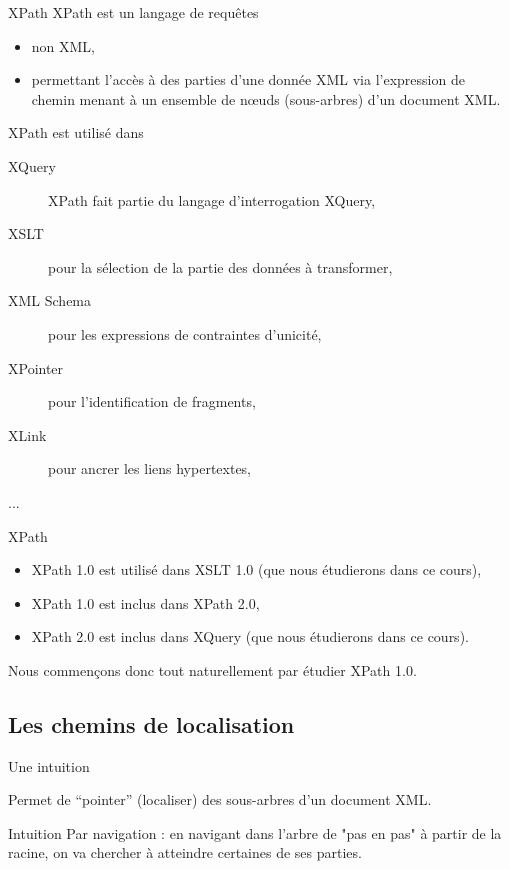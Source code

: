 
\begin{frame}{XPath}
XPath est un langage de requ\^etes
\begin{itemize}
\item non XML,
\item permettant l'accès \`a des parties d’une donn\'ee XML via l'expression de chemin menant \`a un ensemble de n{\oe}uds (sous-arbres) d'un document XML.
\end{itemize}

\medskip

XPath est utilis\'e dans 
\begin{description}
\item[XQuery] XPath fait partie du langage d’interrogation XQuery,
\item[XSLT] pour la s\'election de la partie des donn\'ees \`a transformer,
\item[XML Schema] pour les expressions de contraintes d’unicit\'e,
\item[XPointer] pour l'identification de fragments,
\item[XLink] pour ancrer les liens hypertextes,
\item[...]
\end{description}
\end{frame}



\begin{frame}{XPath}

\begin{itemize}
\item XPath 1.0 est utilis\'e dans XSLT 1.0 (que nous \'etudierons dans ce cours),
\item XPath 1.0 est inclus dans XPath 2.0,
\item XPath 2.0 est inclus dans XQuery (que nous \'etudierons dans ce cours).
\end{itemize}

Nous commen\c{c}ons donc tout naturellement par \'etudier XPath 1.0.
\end{frame}


\subsection{Les chemins de localisation}

\begin{frame}{Une intuition}

Permet de ``pointer'' (localiser) des sous-arbres d'un document XML.

\begin{exampleblock}{Intuition}
Par navigation : en navigant dans l'arbre de "pas en pas" \`a partir de la racine, on va chercher \`a atteindre certaines de ses parties.
\end{exampleblock}

\end{frame}

